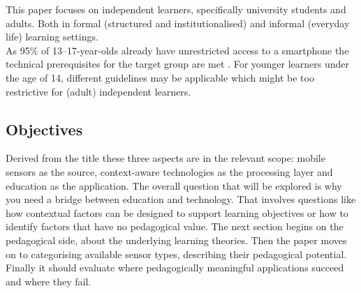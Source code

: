 \documentclass[runningheads]{llncs}
\begin{document}
This paper focuses on independent learners, specifically university students and adults. Both in formal (structured and institutionalised) and informal (everyday life) learning settings. \\ As 95\% of 13–17-year-olds already have unrestricted access to a smartphone the technical prerequisites for the target group are met \cite{pew2024teens}.
For younger learners under the age of 14, different guidelines may be applicable which might be too restrictive for (adult) independent learners.  %





\subsection{Objectives}

Derived from the title these three aspects are in the relevant scope: mobile sensors as the source, context-aware technologies as the processing layer and education as the application.
The overall question that will be explored is why you need a bridge between education and technology. That involves questions like how contextual factors can be designed to support learning objectives or how to identify factors that have no pedagogical value.
The next section begins on the pedagogical side, about the underlying learning theories.
Then the paper moves on to categorising available sensor types, describing their pedagogical potential. Finally it should evaluate where pedagogically meaningful applications succeed and where they fail.\\




\end{document}
